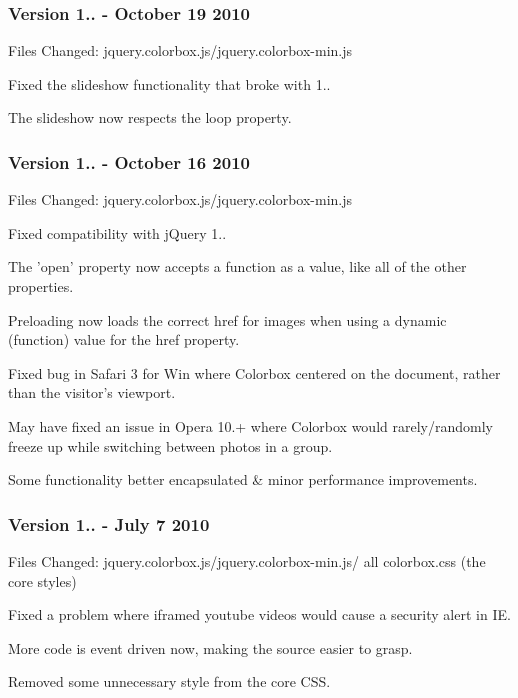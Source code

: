 \subsubsection*{Version 1.. -\/ October 19 2010}

Files Changed\-: jquery.\-colorbox.\-js/jquery.colorbox-\/min.\-js


\begin{DoxyItemize}
\item Fixed the slideshow functionality that broke with 1..
\item The slideshow now respects the loop property.
\end{DoxyItemize}

\subsubsection*{Version 1.. -\/ October 16 2010}

Files Changed\-: jquery.\-colorbox.\-js/jquery.colorbox-\/min.\-js


\begin{DoxyItemize}
\item Fixed compatibility with j\-Query 1..
\item The 'open' property now accepts a function as a value, like all of the other properties.
\item Preloading now loads the correct href for images when using a dynamic (function) value for the href property.
\item Fixed bug in Safari 3 for Win where Colorbox centered on the document, rather than the visitor's viewport.
\item May have fixed an issue in Opera 10.+ where Colorbox would rarely/randomly freeze up while switching between photos in a group.
\item Some functionality better encapsulated \& minor performance improvements.
\end{DoxyItemize}

\subsubsection*{Version 1.. -\/ July 7 2010}

Files Changed\-: jquery.\-colorbox.\-js/jquery.colorbox-\/min.\-js/ all colorbox.\-css (the core styles)


\begin{DoxyItemize}
\item Fixed a problem where iframed youtube videos would cause a security alert in I\-E.
\item More code is event driven now, making the source easier to grasp.
\item Removed some unnecessary style from the core C\-S\-S.
\end{DoxyItemize}

